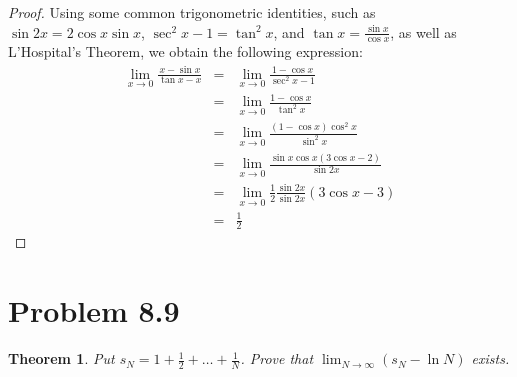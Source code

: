 \documentclass[psamsfonts]{amsart}
\newtheorem{thm}{Theorem}[section]
\theoremstyle{definition}
\theoremstyle{remark}
\numberwithin{equation}{section}
\begin{document}
\begin{proof}
Using some common trigonometric identities, such as $\sin 2x = 2 \cos x \sin x$, $\sec^2 x - 1 = \tan^2 x$, and $\tan x = \frac{\sin x}{\cos x}$, as well as L'Hospital's Theorem, we obtain the following expression:
\begin{eqnarray}
\lim_{x \to 0} \frac{ x - \sin x}{\tan x - x} &=& \lim_{x \to 0} \frac{1 - \cos x}{\sec^2 x - 1} \\
&=& \lim_{x \to 0} \frac{1 - \cos x}{\tan^2 x} \\
&=& \lim_{x \to 0} \frac{(1 - \cos x) \cos^2 x}{ \sin^2 x} \\
&=& \lim_{x \to 0} \frac{\sin x \cos x ( 3 \cos x - 2)}{\sin 2x} \\
&=& \lim_{x \to 0} \frac{1}{2} \frac{\sin 2x}{ \sin 2x} (3 \cos x - 3) \\
&=& \frac{1}{2} 
\end{eqnarray}
\end{proof}

\section{Problem 8.9}

\begin{thm}
Put $s_N = 1 + \frac{1}{2} + \ldots + \frac{1}{N}$. Prove that $\lim_{N \to \infty} (s_N - \ln N)$ exists. 
\end{thm}
\end{document}
